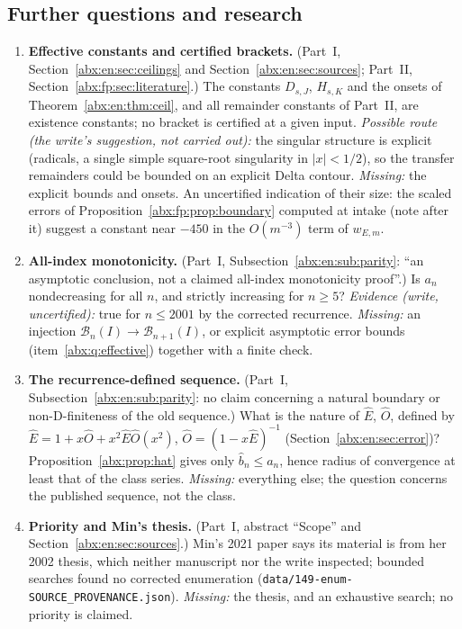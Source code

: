 \documentclass[11pt,letterpaper]{article}
\numberwithin{equation}{section}
\theoremstyle{remark}\newtheorem{remark}[theorem]{Remark}
\newcommand{\BB}{\mathcal B}
\newcommand{\file}[1]{\nolinkurl{#1}}
\begin{document}
\subsection{Further questions and research}\label{abx:sub:questions}
\begin{enumerate}[label=\textbf{\arabic*.},ref=\arabic*,leftmargin=*]
\item\label{abx:q:effective} \textbf{Effective constants and certified brackets.} (Part~I, Section~\ref{abx:en:sec:ceilings} and Section~\ref{abx:en:sec:sources}; Part~II, Section~\ref{abx:fp:sec:literature}.) The constants $D_{s,J}$, $H_{s,K}$ and the onsets of Theorem~\ref{abx:en:thm:ceil}, and all remainder constants of Part~II, are existence constants; no bracket is certified at a given input. \emph{Possible route (the write's suggestion, not carried out):} the singular structure is explicit (radicals, a single simple square-root singularity in $|x|<1/2$), so the transfer remainders could be bounded on an explicit Delta contour. \emph{Missing:} the explicit bounds and onsets. An uncertified indication of their size: the scaled errors of Proposition~\ref{abx:fp:prop:boundary} computed at intake (note after it) suggest a constant near $-450$ in the $O(m^{-3})$ term of $w_{E,m}$.
\item\label{abx:q:monotone} \textbf{All-index monotonicity.} (Part~I, Subsection~\ref{abx:en:sub:parity}: ``an asymptotic conclusion, not a claimed all-index monotonicity proof''.) Is $a_n$ nondecreasing for all $n$, and strictly increasing for $n\ge5$? \emph{Evidence (write, uncertified):} true for $n\le2001$ by the corrected recurrence. \emph{Missing:} an injection $\BB_n(I)\to\BB_{n+1}(I)$, or explicit asymptotic error bounds (item~\ref{abx:q:effective}) together with a finite check.
\item\label{abx:q:hat} \textbf{The recurrence-defined sequence.} (Part~I, Subsection~\ref{abx:en:sub:parity}: no claim concerning a natural boundary or non-D-finiteness of the old sequence.) What is the nature of $\widehat E$, $\widehat O$, defined by $\widehat E=1+x\widehat O+x^2\widehat E\widehat O(x^2)$, $\widehat O=(1-x\widehat E)^{-1}$ (Section~\ref{abx:en:sec:error})? Proposition~\ref{abx:prop:hat} gives only $\hat b_n\le a_n$, hence radius of convergence at least that of the class series. \emph{Missing:} everything else; the question concerns the published sequence, not the class.
\item\label{abx:q:thesis} \textbf{Priority and Min's thesis.} (Part~I, abstract ``Scope'' and Section~\ref{abx:en:sec:sources}.) Min's 2021 paper says its material is from her 2002 thesis, which neither manuscript nor the write inspected; bounded searches found no corrected enumeration (\file{data/149-enum-SOURCE_PROVENANCE.json}). \emph{Missing:} the thesis, and an exhaustive search; no priority is claimed.

\end{enumerate}
\end{document}
